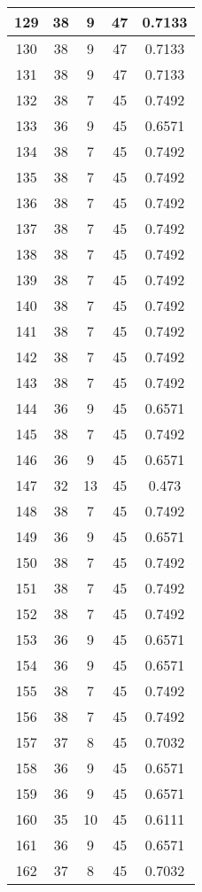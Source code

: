 \documentclass[letterpaper, 12pt]{article}
\begin{document}
\begin{longtable}{|c|c|c|c|c|}
\hline
129 & 38 & 9 & 47 & 0.7133 \\
\hline
130 & 38 & 9 & 47 & 0.7133 \\
\hline
131 & 38 & 9 & 47 & 0.7133 \\
\hline
132 & 38 & 7 & 45 & 0.7492 \\
\hline
133 & 36 & 9 & 45 & 0.6571 \\
\hline
134 & 38 & 7 & 45 & 0.7492 \\
\hline
135 & 38 & 7 & 45 & 0.7492 \\
\hline
136 & 38 & 7 & 45 & 0.7492 \\
\hline
137 & 38 & 7 & 45 & 0.7492 \\
\hline
138 & 38 & 7 & 45 & 0.7492 \\
\hline
139 & 38 & 7 & 45 & 0.7492 \\
\hline
140 & 38 & 7 & 45 & 0.7492 \\
\hline
141 & 38 & 7 & 45 & 0.7492 \\
\hline
142 & 38 & 7 & 45 & 0.7492 \\
\hline
143 & 38 & 7 & 45 & 0.7492 \\
\hline
144 & 36 & 9 & 45 & 0.6571 \\
\hline
145 & 38 & 7 & 45 & 0.7492 \\
\hline
146 & 36 & 9 & 45 & 0.6571 \\
\hline
147 & 32 & 13 & 45 & 0.473 \\
\hline
148 & 38 & 7 & 45 & 0.7492 \\
\hline
149 & 36 & 9 & 45 & 0.6571 \\
\hline
150 & 38 & 7 & 45 & 0.7492 \\
\hline
151 & 38 & 7 & 45 & 0.7492 \\
\hline
152 & 38 & 7 & 45 & 0.7492 \\
\hline
153 & 36 & 9 & 45 & 0.6571 \\
\hline
154 & 36 & 9 & 45 & 0.6571 \\
\hline
155 & 38 & 7 & 45 & 0.7492 \\
\hline
156 & 38 & 7 & 45 & 0.7492 \\
\hline
157 & 37 & 8 & 45 & 0.7032 \\
\hline
158 & 36 & 9 & 45 & 0.6571 \\
\hline
159 & 36 & 9 & 45 & 0.6571 \\
\hline
160 & 35 & 10 & 45 & 0.6111 \\
\hline
161 & 36 & 9 & 45 & 0.6571 \\
\hline
162 & 37 & 8 & 45 & 0.7032 \\

\end{longtable}
\end{document}
